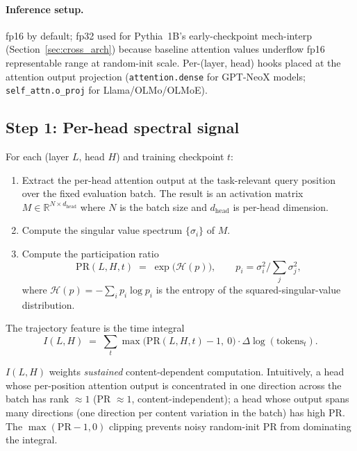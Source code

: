 \documentclass[11pt]{article}
\newcommand{\PR}{\mathrm{PR}}
\begin{document}
\paragraph{Inference setup.} fp16 by default; fp32 used for Pythia~1B's early-checkpoint mech-interp (Section~\ref{sec:cross_arch}) because baseline attention values underflow fp16 representable range at random-init scale. Per-(layer, head) hooks placed at the attention output projection (\texttt{attention.dense} for GPT-NeoX models; \texttt{self\_attn.o\_proj} for Llama/OLMo/OLMoE).

\subsection{Step 1: Per-head spectral signal}
\label{sec:step1}

For each (layer $L$, head $H$) and training checkpoint $t$:

\begin{enumerate}[leftmargin=*,topsep=2pt,itemsep=2pt]
\item Extract the per-head attention output at the task-relevant query position over the fixed evaluation batch. The result is an activation matrix $M \in \mathbb{R}^{N \times d_{\mathrm{head}}}$ where $N$ is the batch size and $d_{\mathrm{head}}$ is per-head dimension.
\item Compute the singular value spectrum $\{\sigma_i\}$ of $M$.
\item Compute the participation ratio
\begin{equation}
\PR(L,H,t) \;=\; \exp\!\big(\mathcal{H}(p)\big), \qquad p_i = \sigma_i^2 \Big/ \sum_j \sigma_j^2,
\label{eq:pr}
\end{equation}
where $\mathcal{H}(p) = -\sum_i p_i \log p_i$ is the entropy of the squared-singular-value distribution.
\end{enumerate}

The trajectory feature is the time integral
\begin{equation}
I(L,H) \;=\; \sum_{t} \max\!\big(\PR(L,H,t) - 1,\ 0\big)\cdot \Delta \log(\text{tokens}_t).
\label{eq:integral}
\end{equation}

$I(L,H)$ weights \emph{sustained} content-dependent computation. Intuitively, a head whose per-position attention output is concentrated in one direction across the batch has rank $\approx 1$ (PR $\approx 1$, content-independent); a head whose output spans many directions (one direction per content variation in the batch) has high PR. The $\max(\PR - 1, 0)$ clipping prevents noisy random-init PR from dominating the integral.
\end{document}
